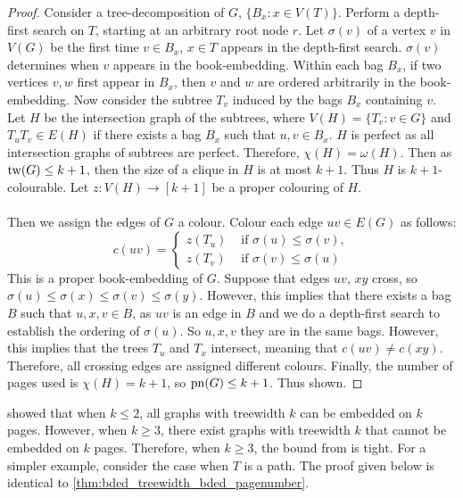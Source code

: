 \begin{proof}
	Consider a tree-decomposition of \(G\), $\{B_x: x \in V(T)\}$. Perform a depth-first search on \(T\), starting at an arbitrary root node \(r\). Let \(\sigma(v)\) of a vertex \(v\) in \(V(G)\) be the first time \(v \in B_x\), $x \in T$ appears in the depth-first search. $\sigma(v)$ determines when $v$ appears in the book-embedding. Within each bag $B_x$, if two vertices $v,w$ first appear in $B_x$, then $v$ and $w$ are ordered arbitrarily in the book-embedding. Now consider the subtree \(T_v\) induced by the bags \(B_x\) containing \(v\). Let \(H\) be the intersection graph of the subtrees, where \(V(H) = \lbrace T_v : v \in G \rbrace\) and \(T_u T_v \in E(H)\) if there exists a bag \(B_x\) such that \(u, v \in B_x\). \(H\) is perfect as all intersection graphs of subtrees are perfect. Therefore, \(\chi(H) = \omega(H)\). Then as \(\operatorname{tw}(G) \leq k + 1\), then the size of a clique in \(H\) is at most \(k + 1\). Thus \(H\) is \(k + 1\)-colourable. Let $z: V(H) \rightarrow [k + 1]$ be a proper colouring of $H$. 
	\paragraph{}
	Then we assign the edges of \(G\) a colour. Colour each edge \(uv \in E(G)\) as follows:
	\begin{equation}
		c(uv) =
		\begin{cases}
			z(T_u) & \text{ if } \sigma(u) \leq \sigma(v), \\
			z(T_v) & \text{ if } \sigma(v) \leq \sigma(u)
		\end{cases}
	\end{equation}
	This is a proper book-embedding of \(G\). Suppose that edges \(uv\), \(xy\) cross, so \(\sigma(u) \leq \sigma(x) \leq \sigma(v) \leq \sigma(y)\). However, this implies that there exists a bag \(B\) such that \(u, x, v \in B\), as \(uv\) is an edge in \(B\) and we do a depth-first search to establish the ordering of $\sigma(u)$. So \(u, x, v\) they are in the same bags. However, this implies that the trees \(T_u\) and \(T_x\) intersect, meaning that \(c(uv) \neq c(xy)\). Therefore, all crossing edges are assigned different colours. Finally, the number of pages used is \(\chi(H) = k + 1\), so \(\operatorname{pn}(G) \leq k + 1\). Thus shown.
\end{proof}
\textcite{dujmovicGraphTreewidthGeometric2007} showed that when $k \leq 2$, all graphs with treewidth $k$ can be embedded on $k$ pages. However, when $k \geq 3$, there exist graphs with treewidth $k$ that cannot be embedded on $k$ pages. Therefore, when $k \geq 3$, the bound from \textcite{ganleyPagenumberTrees2001} is tight. 
For a simpler example, consider the case when $T$ is a path. The proof given below is identical to \cref{thm:bded_treewidth_bded_pagenumber}.

